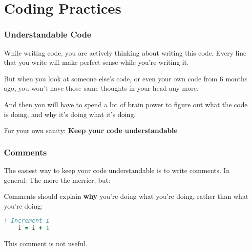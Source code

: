 \section{Coding Practices}

%     
% 
% 
% 
% 
% 
% 
\begin{frame}
    \frametitle{Understandable Code}
    While writing code, you are actively thinking about writing this code.
    Every line that you write will make perfect sense while you're writing it.

    But when you look at someone else's code, or even your own code from 6 months ago,
    you won't have those same thoughts in your head any more.

    And then you will have to spend a lot of brain power to figure out what the code is doing,
    and why it's doing what it's doing.

    For your own sanity: \textbf{Keep your code understandable}
\end{frame}

\begin{frame}[fragile]
    \frametitle{Comments}
    The easiest way to keep your code understandable is to write comments.
    In general: The more the merrier, but:

    Comments should explain \textbf{why} you're doing what you're doing,
    rather than what you're doing:

    \begin{lstlisting}[language=Fortran]
    ! Increment i
    i = i + 1
    \end{lstlisting}
    This comment is not useful.
\end{frame}

